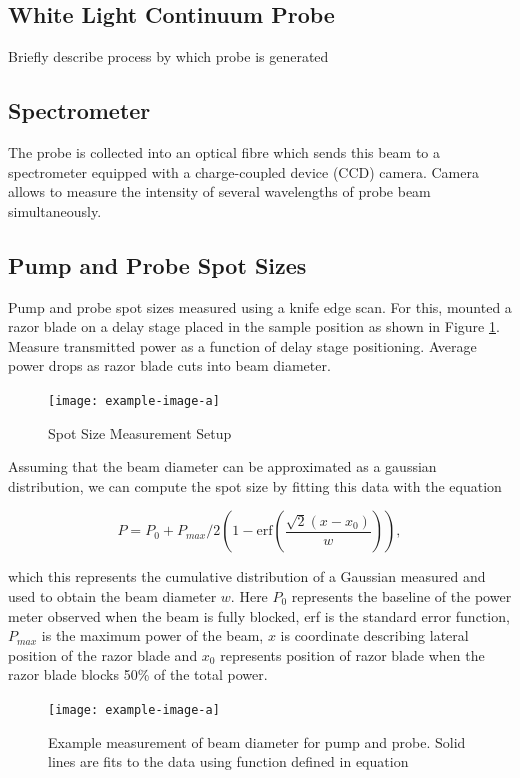 \subsection{White Light Continuum Probe}

{\color{red} Briefly describe process by which probe is generated}

\subsection{Spectrometer}
The probe is collected into an optical fibre which sends this beam to a spectrometer equipped with a charge-coupled device (CCD) camera. Camera allows to measure the intensity of several wavelengths of probe beam simultaneously. 

\subsection{Pump and Probe Spot Sizes}
Pump and probe spot sizes measured using a knife edge scan. For this, mounted a razor blade on a delay stage placed in the sample position as shown in Figure \ref{fig:beam_diameter_setup}. Measure transmitted power as a function of delay stage positioning. Average power drops as razor blade cuts into beam diameter. 

\begin{figure}[h]
	\centering
	\texttt{[image: example-image-a]}
	\caption{Spot Size Measurement Setup}
	\label{fig:beam_diameter_setup}
\end{figure}

Assuming that the beam diameter can be approximated as a gaussian distribution, we can compute the spot size by fitting this data with the equation 

\begin{equation}
	P = P_0 + P_{max}/2 \left( 1 - \mathrm{erf} \left( \dfrac{\sqrt{2}(x - x_0)}{w} \right) \right),
\end{equation}

which this represents the cumulative distribution of a Gaussian measured and used to obtain the beam diameter $w$. Here $P_0$ represents the baseline of the power meter observed when the beam is fully blocked, erf is the standard error function, $P_{max}$ is the maximum power of the beam, $x$ is coordinate describing lateral position of the razor blade and $x_0$ represents position of razor blade when the razor blade blocks 50\% of the total power.  



\begin{figure}[h]
	\centering
	\texttt{[image: example-image-a]}
	\caption{Example measurement of beam diameter for pump and probe. Solid lines are fits to the data using function defined in equation}
		\label{fig:beam_diamter_measurement}
\end{figure}



